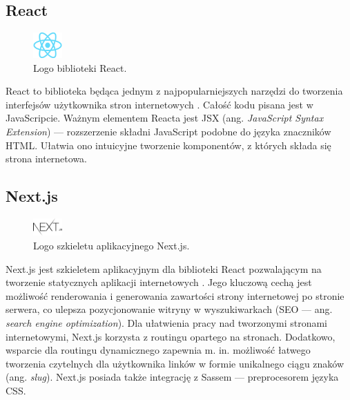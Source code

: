 \documentclass[12pt]{article}
\numberwithin{figure}{section}
\begin{document}
\begin{sloppypar}

\subsection*{React}

\begin{figure}[H] 
    \centering
        \includegraphics[width=0.1\textwidth]{images/react-logo.png}
   \caption{Logo biblioteki React.}
\end{figure}

React to biblioteka będąca jednym z najpopularniejszych narzędzi do tworzenia interfejsów użytkownika stron internetowych \cite{react}. Całość kodu pisana jest w JavaScripcie. Ważnym elementem Reacta jest JSX (ang. \textit{JavaScript Syntax Extension}) --- rozszerzenie składni JavaScript podobne do języka znaczników HTML. Ułatwia ono intuicyjne tworzenie komponentów, z których składa się strona internetowa.


\subsection*{Next.js}

\begin{figure}[H] 
    \centering
        \includegraphics[width=0.1\textwidth]{images/next-logo.png}
   \caption{Logo szkieletu aplikacyjnego Next.js.}
\end{figure}

Next.js jest szkieletem aplikacyjnym dla biblioteki React pozwalającym na tworzenie statycznych aplikacji internetowych \cite{next}. Jego kluczową cechą jest możliwość renderowania i generowania zawartości strony internetowej po stronie serwera, co ulepsza pozycjonowanie witryny w wyszukiwarkach (SEO --- ang. \textit{search engine optimization}). Dla ułatwienia pracy nad tworzonymi stronami internetowymi, Next.js korzysta z routingu opartego na stronach. Dodatkowo, wsparcie dla routingu dynamicznego zapewnia m. in. możliwość łatwego tworzenia czytelnych dla użytkownika linków w formie unikalnego ciągu znaków (ang. \textit{slug}). Next.js posiada także integrację z Sassem --- preprocesorem języka CSS.


\end{sloppypar}
\end{document}
